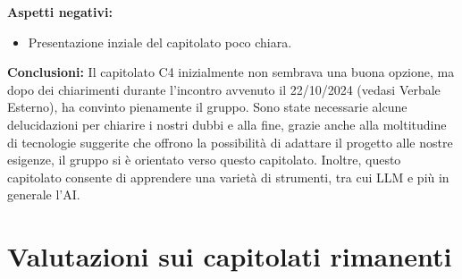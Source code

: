 \documentclass[10pt]{article}
\begin{document}
\newpage
\textbf{Aspetti negativi:}
\begin{itemize}
    \item Presentazione inziale del capitolato poco chiara.
\end{itemize}
\textbf{Conclusioni:}  
Il capitolato C4 inizialmente non sembrava una buona opzione, ma dopo dei chiarimenti durante l’incontro avvenuto il 22/10/2024 (vedasi Verbale Esterno), ha convinto pienamente il gruppo. Sono state necessarie alcune delucidazioni per chiarire i nostri dubbi e alla fine, grazie anche alla moltitudine di tecnologie suggerite che offrono la possibilità di adattare il progetto alle nostre esigenze, il gruppo si è orientato verso questo capitolato. Inoltre, questo capitolato consente di apprendere una varietà di strumenti, tra cui LLM e più in generale l’AI.

\section{Valutazioni sui capitolati rimanenti}
\end{document}
